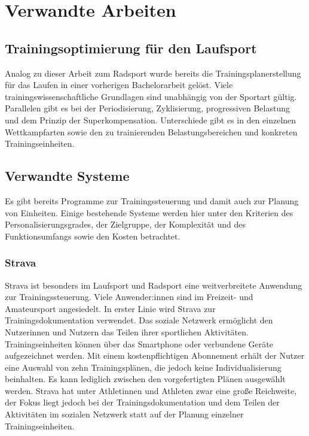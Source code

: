 \chapter{Verwandte Arbeiten}
\label{sec:verwandt}

\section{Trainingsoptimierung für den Laufsport}
\label{sec:verwandt:sec1}
Analog zu dieser Arbeit zum Radsport wurde bereits die Trainingsplanerstellung für das Laufen in einer vorherigen Bachelorarbeit \cite{BALaufen} gelöst. 
Viele trainingswissenschaftliche Grundlagen sind unabhängig von der Sportart gültig. Parallelen gibt es bei der Periodisierung, Zyklisierung, progressiven Belastung und dem Prinzip der Superkompensation. Unterschiede gibt es in den einzelnen Wettkampfarten sowie den zu trainierenden Belastungsbereichen und konkreten Trainingseinheiten.

\section{Verwandte Systeme}
Es gibt bereits Programme zur Trainingssteuerung und damit auch zur Planung von Einheiten. Einige bestehende Systeme werden hier unter den Kriterien des Personalisierungsgrades, der Zielgruppe, der Komplexität und des Funktionsumfangs sowie den Kosten betrachtet.

\subsection{Strava}
Strava \cite{StravaWeb} ist besonders im Laufsport und Radsport eine weitverbreitete Anwendung zur Trainingssteuerung. Viele Anwender:innen sind im Freizeit- und Amateursport angesiedelt. In erster Linie wird Strava zur Trainingsdokumentation verwendet. Das soziale Netzwerk ermöglicht den Nutzerinnen und  Nutzern das Teilen ihrer sportlichen Aktivitäten. Trainingseinheiten können über das Smartphone oder verbundene Geräte aufgezeichnet werden. Mit einem kostenpflichtigen Abonnement erhält der Nutzer eine Auswahl von zehn Trainingsplänen, die jedoch keine Individualisierung beinhalten. Es kann lediglich zwischen den vorgefertigten Plänen ausgewählt werden. Strava hat unter Athletinnen und Athleten zwar eine große Reichweite, der Fokus liegt jedoch bei der Trainingsdokumentation und dem Teilen der Aktivitäten im sozialen Netzwerk statt auf der Planung einzelner Trainingseinheiten.

